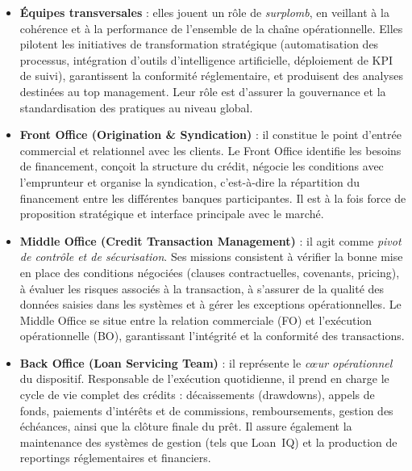 \begin{itemize}
    \item \textbf{Équipes transversales} : elles jouent un rôle de \textit{surplomb}, en veillant à la cohérence et à la performance de l'ensemble de la chaîne opérationnelle. Elles pilotent les initiatives de transformation stratégique (automatisation des processus, intégration d'outils d'intelligence artificielle, déploiement de KPI de suivi), garantissent la conformité réglementaire, et produisent des analyses destinées au top management. Leur rôle est d'assurer la gouvernance et la standardisation des pratiques au niveau global.

    \item \textbf{Front Office (Origination \& Syndication)} : il constitue le point d'entrée commercial et relationnel avec les clients. Le Front Office identifie les besoins de financement, conçoit la structure du crédit, négocie les conditions avec l'emprunteur et organise la syndication, c'est-à-dire la répartition du financement entre les différentes banques participantes. Il est à la fois force de proposition stratégique et interface principale avec le marché.

    \item \textbf{Middle Office (Credit Transaction Management)} : il agit comme \textit{pivot de contrôle et de sécurisation}. Ses missions consistent à vérifier la bonne mise en place des conditions négociées (clauses contractuelles, covenants, pricing), à évaluer les risques associés à la transaction, à s'assurer de la qualité des données saisies dans les systèmes et à gérer les exceptions opérationnelles. Le Middle Office se situe entre la relation commerciale (FO) et l'exécution opérationnelle (BO), garantissant l'intégrité et la conformité des transactions.

    \item \textbf{Back Office (Loan Servicing Team)} : il représente le \textit{cœur opérationnel} du dispositif. Responsable de l'exécution quotidienne, il prend en charge le cycle de vie complet des crédits : décaissements (drawdowns), appels de fonds, paiements d'intérêts et de commissions, remboursements, gestion des échéances, ainsi que la clôture finale du prêt. Il assure également la maintenance des systèmes de gestion (tels que Loan~IQ) et la production de reportings réglementaires et financiers.
\end{itemize}

